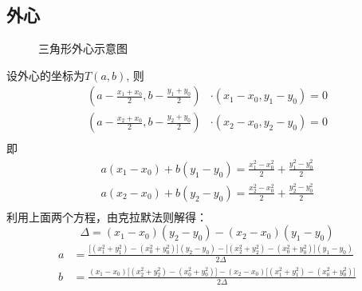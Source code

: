 \subsection{外心}
\begin{figure}[H]
    \centering
    \caption{三角形外心示意图}
    \label{fig:circumcenter}
\end{figure}
设外心的坐标为\(T(a, b)\), 则
\begin{align*}
    (a - \frac{x_1+x_0}{2}, b-\frac{y_1+y_0}{2})&\cdot
(x_1-x_0, y_1-y_0) = 0\\
(a - \frac{x_2+x_0}{2}, b-\frac{y_2+y_0}{2})&\cdot
(x_2-x_0, y_2-y_0) = 0\\
\end{align*}
即
\begin{align*}
    a(x_1-x_0)+b(y_1-y_0) = \frac{x_1^2-x_0^2}{2}+\frac{y_1^2-y_0^2}{2}\\
    a(x_2-x_0)+b(y_2-y_0) = \frac{x_2^2-x_0^2}{2}+\frac{y_2^2-y_0^2}{2}\\
\end{align*}
利用上面两个方程，由克拉默法则解得：
\[
\Delta = (x_1-x_0)(y_2-y_0) - (x_2-x_0)(y_1-y_0)
\]
\begin{align*}
    a &= \frac{\big[(x_1^2+y_1^2)-(x_0^2+y_0^2)\big](y_2-y_0) - \big[(x_2^2+y_2^2)-(x_0^2+y_0^2)\big](y_1-y_0)}{2\Delta}\\[4pt]
    b &= \frac{(x_1-x_0)\big[(x_2^2+y_2^2)-(x_0^2+y_0^2)\big] - (x_2-x_0)\big[(x_1^2+y_1^2)-(x_0^2+y_0^2)\big]}{2\Delta}
\end{align*}